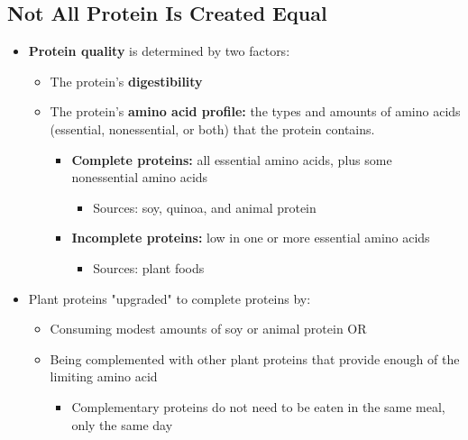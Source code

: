 \documentclass[12pt]{article}
\begin{document}
        \subsection{Not All Protein Is Created Equal}
            \begin{itemize}
                \item \textbf{Protein quality} is determined by two factors:
                    \begin{itemize}
                        \item The protein's \textbf{digestibility}
                        \item The protein's \textbf{amino acid profile:} the types and amounts of amino acids (essential, nonessential, or both) that the protein contains.
                            \begin{itemize}
                                \item \textbf{Complete proteins:} all essential amino acids, plus some nonessential amino acids
                                    \begin{itemize}
                                        \item Sources: soy, quinoa, and animal protein
                                    \end{itemize}
                                \item \textbf{Incomplete proteins:} low in one or more essential amino acids
                                    \begin{itemize}
                                        \item Sources: plant foods
                                    \end{itemize}
                            \end{itemize}
                    \end{itemize}
                \item Plant proteins "upgraded" to complete proteins by:
                    \begin{itemize}
                        \item Consuming modest amounts of soy or animal protein OR
                        \item Being complemented with other plant proteins that provide enough of the limiting amino acid
                            \begin{itemize}
                                \item Complementary proteins do not need to be eaten in the same meal, only the same day

\end{itemize}
\end{itemize}
\end{itemize}
\end{document}
